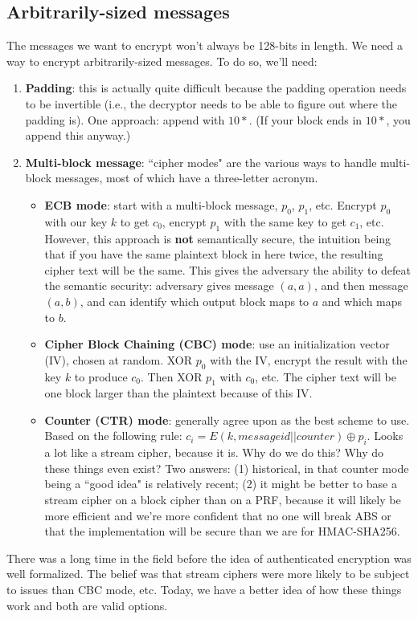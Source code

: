 \documentclass[12pt]{article}
\begin{document}
\subsection*{Arbitrarily-sized messages}

The messages we want to encrypt won't always be 128-bits in length. We need a way to encrypt arbitrarily-sized messages. To do so, we'll need:
\begin{enumerate}
\item \textbf{Padding}: this is actually quite difficult because the padding operation needs to be invertible (i.e., the decryptor needs to be able to figure out where the padding is). One approach: append with $10*$. (If your block ends in $10*$, you append this anyway.)
\item \textbf{Multi-block message}: ``cipher modes" are the various ways to handle multi-block messages, most of which have a three-letter acronym.
\begin{itemize}
\item \textbf{ECB mode}: start with a multi-block message, $p_0$, $p_1$, etc. Encrypt $p_0$ with our key $k$ to get $c_0$, encrypt $p_1$ with the same key to get $c_1$, etc. However, this approach is \textbf{not} semantically secure, the intuition being that if you have the same plaintext block in here twice, the resulting cipher text will be the same. This gives the adversary the ability to defeat the semantic security: adversary gives message $(a, a)$, and then message $(a, b)$, and can identify which output block maps to $a$ and which maps to $b$.
\item \textbf{Cipher Block Chaining (CBC) mode}: use an initialization vector (IV), chosen at random. XOR $p_0$ with the IV, encrypt the result with the key $k$ to produce $c_0$. Then XOR $p_1$ with $c_0$, etc. The cipher text will be one block larger than the plaintext because of this IV.
\item \textbf{Counter (CTR) mode}: generally agree upon as the best scheme to use. Based on the following rule: $c_i = E(k, messageid || counter) \oplus p_i$. Looks a lot like a stream cipher, because it is. Why do we do this? Why do these things even exist? Two answers: (1) historical, in that counter mode being a ``good idea" is relatively recent; (2) it might be better to base a stream cipher on a block cipher than on a PRF, because it will likely be more efficient and we're more confident that no one will break ABS or that the implementation will be secure than we are for HMAC-SHA256.
\end{itemize}
\end{enumerate}

There was a long time in the field before the idea of authenticated encryption was well formalized. The belief was that stream ciphers were more likely to be subject to issues than CBC mode, etc. Today, we have a better idea of how these things work and both are valid options.
\end{document}

